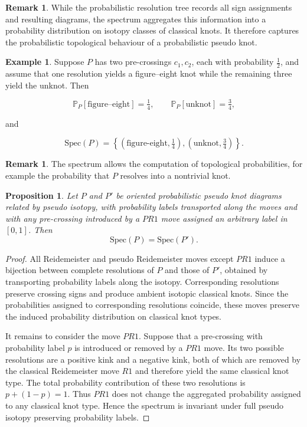 \documentclass[a4paper, reqno, 12pt]{amsart}
\theoremstyle{plain}
\newtheorem{proposition}[theorem]{Proposition}
\theoremstyle{definition}
\newtheorem{example}[theorem]{Example}
\newtheorem{remark}[theorem]{Remark}
\begin{document}
\begin{remark}\rm
While the probabilistic resolution tree records all sign assignments and resulting diagrams, the spectrum aggregates this information into a probability distribution on isotopy classes of classical knots. It therefore captures the probabilistic topological behaviour of a probabilistic pseudo knot.
\end{remark}



\begin{example}
Suppose $P$ has two pre-crossings $c_1,c_2$, each with probability $\frac12$, and assume that one resolution yields a figure--eight knot while the remaining three yield the unknot. Then

\[
\mathbb P_P[\text{figure--eight}]=\tfrac14,
\qquad
\mathbb P_P[\text{unknot}]=\tfrac34,
\]

and

\[
\mathrm{Spec}(P)
=
\left\{
(\text{figure-eight},\tfrac14),
(\text{unknot},\tfrac34)
\right\}.
\]
\end{example}

\begin{remark}\rm
The spectrum allows the computation of topological probabilities, for example the probability that $P$ resolves into a nontrivial knot.
\end{remark}



\begin{proposition}
Let $P$ and $P'$ be oriented probabilistic pseudo knot diagrams related by pseudo isotopy, with probability labels transported along the moves and with any pre-crossing introduced by a \(PR1\) move assigned an arbitrary label in \([0,1]\). Then
\[
\mathrm{Spec}(P)=\mathrm{Spec}(P').
\]
\end{proposition}

\begin{proof}
All Reidemeister and pseudo Reidemeister moves except \(PR1\) induce a bijection between complete resolutions of \(P\) and those of \(P'\), obtained by transporting probability labels along the isotopy. Corresponding resolutions preserve crossing signs and produce ambient isotopic classical knots. Since the probabilities assigned to corresponding resolutions coincide, these moves preserve the induced probability distribution on classical knot types.

It remains to consider the move \(PR1\). Suppose that a pre-crossing with probability label \(p\) is introduced or removed by a \(PR1\) move. Its two possible resolutions are a positive kink and a negative kink, both of which are removed by the classical Reidemeister move \(R1\) and therefore yield the same classical knot type. The total probability contribution of these two resolutions is \(p+(1-p)=1\). Thus \(PR1\) does not change the aggregated probability assigned to any classical knot type. Hence the spectrum is invariant under full pseudo isotopy preserving probability labels.
\end{proof}
\end{document}
